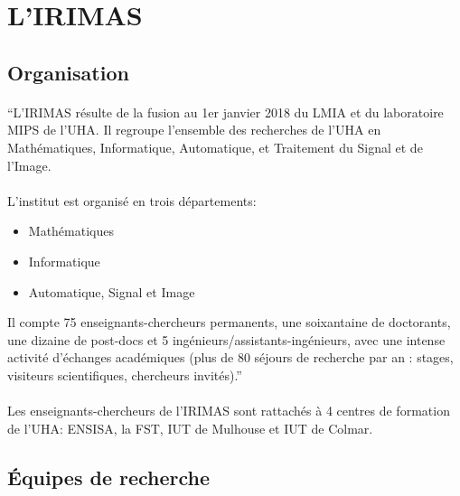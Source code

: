 \documentclass[a4paper,11pt,twoside,french,report]{../common/simplem}
\begin{document}
		\section{L'\acrshort{IRIMAS}}
			\subsection{Organisation}
				\paragraph*{}
					``L'\gls{IRIMAS} résulte de la fusion au 1er janvier 2018 du \gls{LMIA} et du laboratoire \gls{MIPS} de l'\gls{UHA}. Il regroupe l'ensemble des recherches de l'\gls{UHA} en Mathématiques, Informatique, Automatique, et Traitement du Signal et de l'Image.
				\paragraph*{}
					L’institut est organisé en trois départements:
					\begin{itemize}
						\item Mathématiques
						\item Informatique
						\item Automatique, Signal et Image
					\end{itemize}
					Il compte 75 enseignants-chercheurs permanents, une soixantaine de doctorants, une dizaine de post-docs et 5 ingénieurs/assistants-ingénieurs, avec une intense activité d’échanges académiques (plus de 80 séjours de recherche par an : stages, visiteurs scientifiques, chercheurs invités).''~\cite{UHA_IRIMAS}
				\paragraph*{}
					Les enseignants-chercheurs de l'\gls{IRIMAS} sont rattachés à 4 centres de formation de l'\gls{UHA}: \gls{ENSISA}, la \gls{FST}, \gls{IUT} de Mulhouse et \gls{IUT} de Colmar.
			\subsection{Équipes de recherche}
\end{document}
